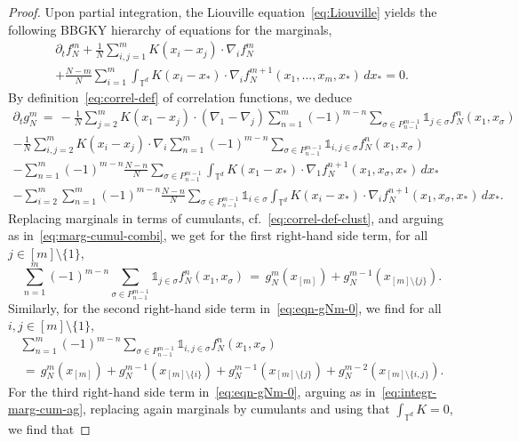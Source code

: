 \documentclass[a4paper,11pt,reqno,noindent]{amsart}
\theoremstyle{plain}
\numberwithin{equation}{section}
\newcommand{\T}{\mathbb T}
\newcommand{\3}{|\!|\!|}
\begin{document}
\begin{proof}
Upon partial integration, the Liouville equation~\eqref{eq:Liouville} yields the following BBGKY hierarchy of equations for the marginals,
\begin{multline}\label{eq:BBGKY}
\partial_tf_N^m+\tfrac1N\sum_{i,j=1}^mK(x_i-x_j)\cdot\nabla_if_N^m\\
+\tfrac{N-m}N\sum_{i=1}^m\int_{\T^d} K(x_i-x_*)\cdot\nabla_if_N^{m+1}(x_1,\ldots,x_m,x_*)\,dx_*=0.
\end{multline}
By definition~\eqref{eq:correl-def} of correlation functions, we deduce
\begin{multline}\label{eq:eqn-gNm-0}
\partial_tg_N^m
\,=\,-\tfrac1N\sum_{j=2}^mK(x_1-x_j)\cdot(\nabla_1-\nabla_j)\sum_{n=1}^m(-1)^{m-n}\sum_{\sigma\in P_{n-1}^{m-1}}\mathds1_{j\in\sigma}f_N^n(x_1,x_{\sigma})\\
-\tfrac1N\sum_{i,j=2}^mK(x_i-x_j)\cdot\nabla_i\sum_{n=1}^m(-1)^{m-n}\sum_{\sigma\in P_{n-1}^{m-1}}\mathds1_{i,j\in\sigma}f_N^n(x_1,x_\sigma)\\
-\sum_{n=1}^m(-1)^{m-n}\tfrac{N-n}N\sum_{\sigma\in P_{n-1}^{m-1}}\int_{\T^d} K(x_1-x_*)\cdot\nabla_1f_N^{n+1}(x_1,x_\sigma,x_*)\,dx_*\\
-\sum_{i=2}^m\sum_{n=1}^m(-1)^{m-n}\tfrac{N-n}N\sum_{\sigma\in P_{n-1}^{m-1}}\mathds1_{i\in\sigma}\int_{\T^d} K(x_i-x_*)\cdot\nabla_if_N^{n+1}(x_1,x_\sigma,x_*)\,dx_*.
\end{multline}
Replacing marginals in terms of cumulants, cf.~\eqref{eq:correl-def-clust}, and arguing as in~\eqref{eq:marg-cumul-combi}, we get for the first right-hand side term, for all $j\in[m]\setminus\{1\}$,
\begin{equation*}
\sum_{n=1}^m(-1)^{m-n}\sum_{\sigma\in P_{n-1}^{m-1}}\mathds1_{j\in\sigma}f_N^n(x_1,x_{\sigma})
\,=\,g_N^m(x_{[m]})+g_N^{m-1}(x_{[m]\setminus\{j\}}).
\end{equation*}
Similarly, for the second right-hand side term in~\eqref{eq:eqn-gNm-0}, we find for all $i,j\in[m]\setminus\{1\}$,
\begin{multline*}
\sum_{n=1}^m(-1)^{m-n}\sum_{\sigma\in P_{n-1}^{m-1}}\mathds1_{i,j\in\sigma}f_N^n(x_1,x_\sigma)\\
\,=\,g_N^m(x_{[m]})
+g_N^{m-1}(x_{[m]\setminus\{i\}})+g_N^{m-1}(x_{[m]\setminus\{j\}})
+g_N^{m-2}(x_{[m]\setminus\{i,j\}}).
\end{multline*}
For the third right-hand side term in~\eqref{eq:eqn-gNm-0}, arguing as in~\eqref{eq:integr-marg-cum-ag}, replacing again marginals by cumulants and using that $\int_{\T^d} K=0$, we find that

\end{proof}
\end{document}
